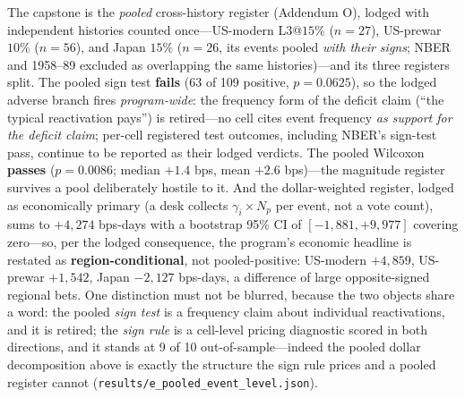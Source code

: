 \documentclass{article}
\begin{document}
The capstone is the \emph{pooled} cross-history register (Addendum
O), lodged with independent histories counted once---US-modern
L3@$15\%$ ($n{=}27$), US-prewar $10\%$ ($n{=}56$), and Japan $15\%$
($n{=}26$, its events pooled \emph{with their signs}; NBER and
1958--89 excluded as overlapping the same histories)---and its three
registers split. The pooled sign test \textbf{fails} (63 of 109
positive, $p = 0.0625$), so the lodged adverse branch fires
\emph{program-wide}: the frequency form of the deficit claim
(``the typical reactivation pays'') is retired---no cell cites event
frequency \emph{as support for the deficit claim}; per-cell
registered test outcomes, including NBER's sign-test pass, continue
to be reported as their lodged verdicts. The pooled Wilcoxon
\textbf{passes} ($p = 0.0086$; median $+1.4$ bps, mean $+2.6$
bps)---the magnitude register survives a pool deliberately hostile
to it. And the dollar-weighted register, lodged as economically
primary (a desk collects $\gamma_i \times N_p$ per event, not a
vote count), sums to $+4{,}274$ bps-days with a bootstrap 95\% CI
of $[-1{,}881, +9{,}977]$ covering zero---so, per the lodged
consequence, the program's economic headline is restated as
\textbf{region-conditional}, not pooled-positive: US-modern
$+4{,}859$, US-prewar $+1{,}542$, Japan $-2{,}127$ bps-days, a
difference of large opposite-signed regional bets. One distinction
must not be blurred, because the two objects share a word: the
pooled \emph{sign test} is a frequency claim about individual
reactivations, and it is retired; the \emph{sign rule} is a
cell-level pricing diagnostic scored in both directions, and it
stands at 9 of 10 out-of-sample---indeed the pooled dollar
decomposition above is exactly the structure the sign rule prices
and a pooled register cannot
(\texttt{results/e\_pooled\_event\_level.json}).
\end{document}
